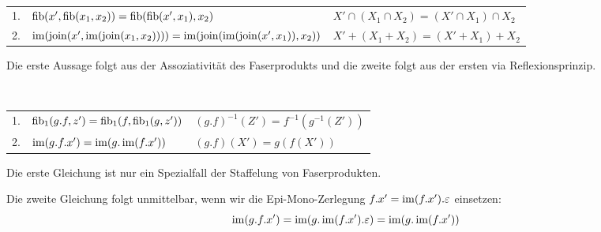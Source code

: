 \begin{lemm}[Regel (c)]
\ \linebreak

\begin{tabular}{rll}
   1.
&  $\operatorname{fib}(x',\operatorname{fib}(x_1,x_2)) = \operatorname{fib}(\operatorname{fib}(x',x_1),x_2)$
&  $X' \cap (X_1 \cap X_2) = (X' \cap X_1) \cap X_2$
\\ 2.
&  $\operatorname{im}(\operatorname{join}(x',\operatorname{im}(\operatorname{join}(x_1,x_2)))) = \operatorname{im}(\operatorname{join}(\operatorname{im}(\operatorname{join}(x',x_1)),x_2))$
&  $X' + (X_1 + X_2) = (X' + X_1) + X_2$
\end{tabular}
\end{lemm}
\begin{bew}
Die erste Aussage folgt aus der Assoziativität des Faserprodukts und die zweite folgt aus der ersten via Reflexionsprinzip.
\end{bew}

\begin{lemm}[Regel (d)]
\ \linebreak

\begin{tabular}{rll}
   1.
&  $\operatorname{fib}_1(g.f, z') = \operatorname{fib}_1(f, \operatorname{fib}_1(g, z'))$
&  $(g.f)^{-1}(Z') = f^{-1}(g^{-1}(Z'))$
\\ 2.
&  $\operatorname{im}(g.f.x') = \operatorname{im}(g.\operatorname{im}(f.x'))$
&  $(g.f)(X') = g(f(X'))$
\end{tabular}
\end{lemm}
\begin{bew}
Die erste Gleichung ist nur ein Spezialfall der Staffelung von Faserprodukten.

Die zweite Gleichung folgt unmittelbar, wenn wir die Epi-Mono-Zerlegung $f.x' = \operatorname{im}(f.x').\varepsilon$ einsetzen:
\[\operatorname{im}(g.f.x') = \operatorname{im}(g.\operatorname{im}(f.x').\varepsilon) = \operatorname{im}(g.\operatorname{im}(f.x')) \]
\end{bew}

